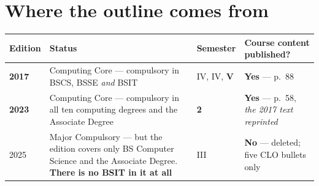 \section*{Where the outline comes from}

\begin{longtable}{@{}L{1.6cm}L{4.4cm}L{3.2cm}L{5.0cm}@{}}
\toprule
{}
\textbf{Edition} & \textbf{Status} & \textbf{Semester} &
\textbf{Course content published?} \\
\midrule
\endhead
\textbf{2017} & Computing Core --- compulsory in BSCS, BSSE \emph{and} BSIT &
IV, IV, \textbf{V} & \textbf{Yes} --- p.~88 \\
\textbf{2023} & Computing Core --- compulsory in all ten computing degrees and
the Associate Degree & \textbf{2} & \textbf{Yes} --- p.~58, \emph{the 2017 text
reprinted} \\
2025 & Major Compulsory --- but the edition covers only BS Computer Science
and the Associate Degree. \textbf{There is no BSIT in it at all} & III &
\textbf{No} --- deleted; five CLO bullets only \\
\bottomrule
\end{longtable}

